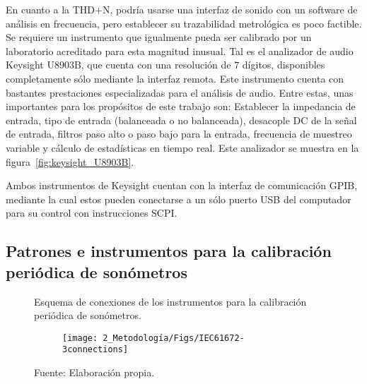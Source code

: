En cuanto a la THD+N, podría usarse una interfaz de sonido con un software de análisis en frecuencia, pero establecer su trazabilidad metrológica es poco factible.
Se requiere un instrumento que igualmente pueda ser calibrado por un laboratorio acreditado para esta magnitud inusual.
Tal es el analizador de audio Keysight U8903B, que cuenta con una resolución de $7$ dígitos, disponibles completamente sólo mediante la interfaz remota.
Este instrumento cuenta con bastantes prestaciones especializadas para el análisis de audio.
Entre estas, unas importantes para los propósitos de este trabajo son: Establecer la impedancia de entrada, tipo de entrada (balanceada o no balanceada), desacople DC de la señal de entrada, filtros paso alto o paso bajo para la entrada, frecuencia de muestreo variable y cálculo de estadísticas en tiempo real.
Este analizador se muestra en la figura~\ref{fig:keysight_U8903B}.

Ambos instrumentos de Keysight cuentan con la interfaz de comunicación GPIB, mediante la cual estos pueden conectarse a un sólo puerto USB del computador para su control con instrucciones SCPI\@.

\subsection{Patrones e instrumentos para la calibración periódica de sonómetros}

\begin{figure}[!h]
    \caption{Esquema de conexiones de los instrumentos para la calibración periódica de sonómetros.}
    \label{fig:IEC61672_connections}
    \begin{subfigure}[t]{0.59\textwidth}
        \centering
        \texttt{[image: 2\_Metodología/Figs/IEC61672-3connections]}
    \end{subfigure}
    \hfill
    \begin{subfigure}[t]{0.4\textwidth}
        \centering
    \end{subfigure}
    \caption*{\footnotesize Fuente: Elaboración propia.}
\end{figure}

